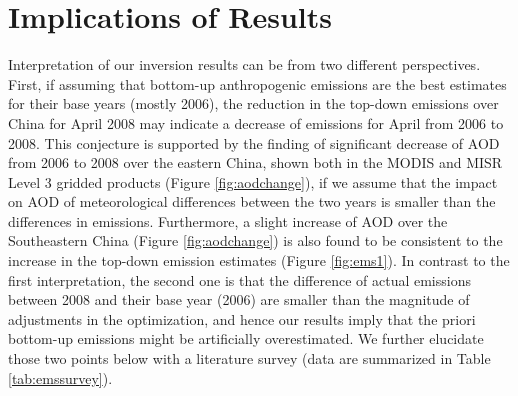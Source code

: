\section{Implications of Results} \label{sec:invimplication}

  Interpretation of our inversion results can be from two different perspectives. 
First, if assuming that bottom-up anthropogenic emissions are the best estimates for their base years (mostly 2006), 
the reduction in the top-down emissions over China for April 2008 may indicate a decrease of emissions for April from 2006 to 2008. 
This conjecture is supported by the finding of significant decrease of AOD from 2006 to 2008 over the eastern China, 
shown both in the MODIS and MISR Level 3 gridded products (Figure \ref{fig:aodchange}),
if we assume that the impact on AOD of meteorological differences between the two years is smaller than the differences in emissions.
Furthermore, a slight increase of AOD over the Southeastern China (Figure \ref{fig:aodchange}) 
is also found to be consistent to the increase in the top-down emission estimates (Figure \ref{fig:ems1}). 
In contrast to the first interpretation, the second one is that the difference of actual emissions between 2008 and their base year (2006)
are smaller than the magnitude of adjustments in the optimization, 
and hence our results imply that the priori bottom-up emissions might be artificially overestimated. 
We further elucidate those two points below with a literature survey (data are summarized in Table \ref{tab:emssurvey}).

